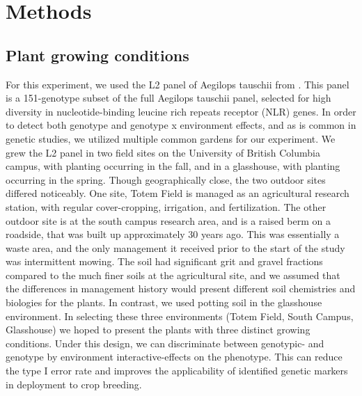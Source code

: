 \documentclass[12pt, letterpaper]{report}
\begin{document}
\section{Methods}

\subsection{Plant growing conditions}

For this experiment, we used the L2 panel of Aegilops tauschii from \textcite{gaurav_population_2021}. This panel is a 151-genotype subset of the full Aegilops tauschii panel, selected for high diversity in nucleotide-binding leucine rich repeats receptor (NLR) genes. In order to detect both genotype and genotype x environment effects, and as is common in genetic studies, we utilized multiple common gardens for our experiment. We grew the L2 panel in two field sites on the University of British Columbia campus, with planting occurring in the fall, and in a glasshouse, with planting occurring in the spring. Though geographically close, the two outdoor sites differed noticeably. One site, Totem Field is managed as an agricultural research station, with regular cover-cropping, irrigation, and fertilization. The other outdoor site is at the south campus research area, and is a raised berm on a roadside, that was built up approximately 30 years ago. This was essentially a waste area, and the only management it received prior to the start of the study was intermittent mowing. The soil had significant grit and gravel fractions compared to the much finer soils at the agricultural site, and we assumed that the differences in management history would present different soil chemistries and biologies for the plants. In contrast, we used potting soil in the glasshouse environment. In selecting these three environments (Totem Field, South Campus, Glasshouse) we hoped to present the plants with three distinct growing conditions. Under this design, we can discriminate between genotypic- and genotype by environment interactive-effects on the phenotype. This can reduce the type I error rate and improves the applicability of identified genetic markers in deployment to crop breeding.
\end{document}
